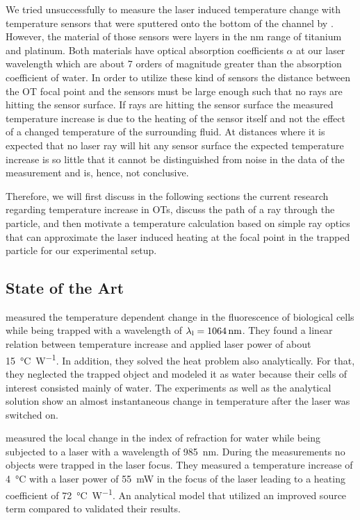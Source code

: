 We tried unsuccessfully to measure the laser induced temperature change with 
temperature sensors that were sputtered onto the bottom of the channel by 
. However, the material of those sensors were layers in the 
\si{\nm} range of titanium and platinum. Both materials have optical absorption 
coefficients $\alpha$ at our laser wavelength which are about 7 orders of 
magnitude greater than the absorption coefficient of water. In order to utilize 
these kind of sensors the distance between the OT focal point and the sensors 
must be large enough such that no rays are hitting the sensor surface. If rays 
are hitting the sensor surface the measured temperature increase is due to the 
heating of the sensor itself and not the effect of a changed temperature of the 
surrounding fluid. At distances where it is expected that no laser ray will hit 
any sensor surface the expected temperature increase is so little that it 
cannot be distinguished from noise in the data of the measurement and is, 
hence, not conclusive.

Therefore, we will first discuss in the following sections the current research 
regarding temperature increase in OTs, discuss the path of a ray through the 
particle, and then motivate a temperature calculation based on simple ray 
optics that can approximate the laser induced heating at the focal point in the 
trapped particle for our experimental setup.

\subsection{State of the Art}\label{sec:TO-state}

 measured the temperature dependent change in the fluorescence 
of biological cells while being trapped with a wavelength of 
$\lal=\SI{1064}{\nm}$. They found a linear relation between temperature 
increase and applied laser power of about \SI{15}{\degreeCelsius\per\watt}. In 
addition, they solved the heat problem also analytically. For that, they 
neglected the trapped object and modeled it as water because their cells of 
interest consisted mainly of water. The experiments as well as the analytical 
solution show an almost instantaneous change in temperature after the laser was 
switched on.

 measured the local change in the index of refraction for 
water while being subjected to a laser with a wavelength of \SI{985}{\nm}. 
During the measurements no objects were trapped in the laser focus. They 
measured a temperature increase of \SI{4}{\degreeCelsius} with a laser power of 
\SI{55}{\milli\watt} in the focus of the laser leading to a heating coefficient 
of \SI{72}{\degreeCelsius\per\watt}. An analytical model that utilized an 
improved source term compared to \cite{Liu1995} validated their results.

